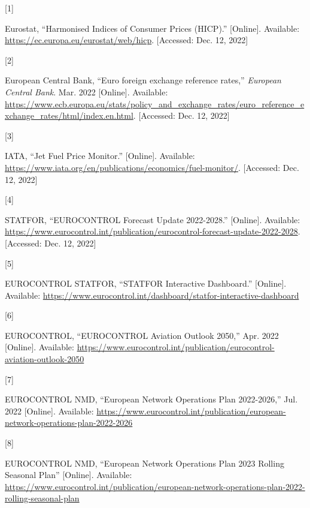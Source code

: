 \documentclass[
  11pt,
  a4paper,
]{book}
\newlength{\cslhangindent}
\newlength{\csllabelwidth}
\newlength{\cslentryspacingunit} %
\newenvironment{CSLReferences}[2] %
 {%
  \setlength{\parindent}{0pt}
  \ifodd #1
  \let\oldpar\par
  \def\par{\hangindent=\cslhangindent\oldpar}
  \fi
  \setlength{\parskip}{#2\cslentryspacingunit}
 }%
 {}
\newcommand{\CSLLeftMargin}[1]{\parbox[t]{\csllabelwidth}{#1}}
\newcommand{\CSLRightInline}[1]{\parbox[t]{\linewidth - \csllabelwidth}{#1}\break}
\begin{document}
\hypertarget{refs}{}
\begin{CSLReferences}{0}{0}
\leavevmode{}%
\CSLLeftMargin{{[}1{]} }%
\CSLRightInline{Eurostat, {``Harmonised {Indices} of {Consumer Prices}
({HICP}).''} {[}Online{]}. Available:
\url{https://ec.europa.eu/eurostat/web/hicp}. {[}Accessed: Dec. 12,
2022{]}}

\leavevmode{}%
\CSLLeftMargin{{[}2{]} }%
\CSLRightInline{European Central Bank, {``Euro foreign exchange
reference rates,''} \emph{European Central Bank}. Mar. 2022
{[}Online{]}. Available:
\url{https://www.ecb.europa.eu/stats/policy_and_exchange_rates/euro_reference_exchange_rates/html/index.en.html}.
{[}Accessed: Dec. 12, 2022{]}}

\leavevmode{}%
\CSLLeftMargin{{[}3{]} }%
\CSLRightInline{IATA, {``Jet {Fuel Price Monitor}.''} {[}Online{]}.
Available:
\url{https://www.iata.org/en/publications/economics/fuel-monitor/}.
{[}Accessed: Dec. 12, 2022{]}}

\leavevmode{}%
\CSLLeftMargin{{[}4{]} }%
\CSLRightInline{STATFOR, {``{EUROCONTROL Forecast Update} 2022-2028.''}
{[}Online{]}. Available:
\url{https://www.eurocontrol.int/publication/eurocontrol-forecast-update-2022-2028}.
{[}Accessed: Dec. 12, 2022{]}}

\leavevmode{}%
\CSLLeftMargin{{[}5{]} }%
\CSLRightInline{EUROCONTROL STATFOR, {``{STATFOR Interactive
Dashboard}.''} {[}Online{]}. Available:
\url{https://www.eurocontrol.int/dashboard/statfor-interactive-dashboard}}

\leavevmode{}%
\CSLLeftMargin{{[}6{]} }%
\CSLRightInline{EUROCONTROL, {``{EUROCONTROL Aviation Outlook} 2050,''}
Apr. 2022 {[}Online{]}. Available:
\url{https://www.eurocontrol.int/publication/eurocontrol-aviation-outlook-2050}}

\leavevmode{}%
\CSLLeftMargin{{[}7{]} }%
\CSLRightInline{EUROCONTROL NMD, {``European {Network Operations Plan}
2022-2026,''} Jul. 2022 {[}Online{]}. Available:
\url{https://www.eurocontrol.int/publication/european-network-operations-plan-2022-2026}}

\leavevmode{}%
\CSLLeftMargin{{[}8{]} }%
\CSLRightInline{EUROCONTROL NMD, {``European {Network Operations Plan}
2023 {Rolling Seasonal Plan}''} {[}Online{]}. Available:
\url{https://www.eurocontrol.int/publication/european-network-operations-plan-2022-rolling-seasonal-plan}}


\end{CSLReferences}
\end{document}
